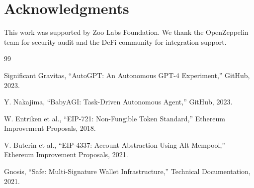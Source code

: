 \section*{Acknowledgments}


This work was supported by Zoo Labs Foundation. We thank the OpenZeppelin team for security audit and the DeFi community for integration support.


\begin{thebibliography}{99}

Significant Gravitas, ``AutoGPT: An Autonomous GPT-4 Experiment,'' GitHub, 2023.

Y. Nakajima, ``BabyAGI: Task-Driven Autonomous Agent,'' GitHub, 2023.

W. Entriken et al., ``EIP-721: Non-Fungible Token Standard,'' Ethereum Improvement Proposals, 2018.

V. Buterin et al., ``EIP-4337: Account Abstraction Using Alt Mempool,'' Ethereum Improvement Proposals, 2021.

Gnosis, ``Safe: Multi-Signature Wallet Infrastructure,'' Technical Documentation, 2021.

\end{thebibliography}

\appendix

